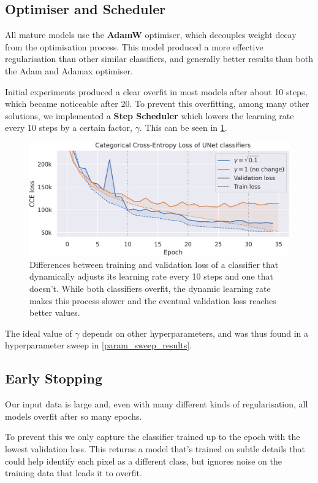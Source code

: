 \subsection{Optimiser and Scheduler}

All mature models use the \textbf{AdamW} optimiser, which decouples weight decay from the optimisation process\cite{adamW}.
This model produced a more effective \lt{} regularisation than other similar classifiers, and generally better results than both the Adam and Adamax optimiser.

Initial experiments produced a clear overfit in most models after about 10 steps, which became noticeable after 20.
To prevent this overfitting, among many other solutions, we implemented a \textbf{Step Scheduler} which lowers the learning rate every 10 steps by a certain factor, $\gamma$.
This can be seen in \cref{gamma_vs_nogamma}.

\begin{figure}
	\centering
	\includegraphics[width=.90\textwidth]{gamma_vs_nogamma.png}
	\caption{Differences between training and validation loss of a classifier that dynamically adjusts its learning rate every 10 steps and one that doesn't. While both classifiers overfit, the dynamic learning rate makes this process slower and the eventual validation loss reaches better values.}
	\label{gamma_vs_nogamma}
\end{figure}

The ideal value of $\gamma$ depends on other hyperparameters, and was thus found in a hyperparameter sweep in \cref{param_sweep_results}.

\subsection{Early Stopping}

Our input data is large and, even with many different kinds of regularisation, all models overfit after so many epochs.

To prevent this we only capture the classifier trained up to the epoch with the lowest validation loss.
This returns a model that's trained on subtle details that could help identify each pixel as a different class, but ignores noise on the training data that leads it to overfit.

